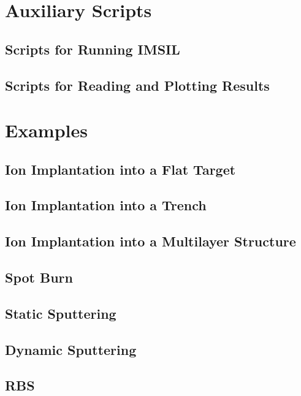\documentclass[twoside,12pt]{book}
\newcommand{\ifprivate}{\iffalse}    %
\begin{document}
\chapter{Auxiliary Scripts}
\label{k:scripts}

%
\section{Scripts for Running IMSIL}
\label{s:scripts_run}

%
\section{Scripts for Reading and Plotting Results}
\label{s:scripts_read}

%
%
\chapter{Examples}
\label{k:ex}
%
\section{Ion Implantation into a Flat Target}

%
\section{Ion Implantation into a Trench}


\section{Ion Implantation into a Multilayer Structure}


\section{Spot Burn}


\section{Static Sputtering}


\section{Dynamic Sputtering}


\section{RBS}


\ifprivate
\section{Example 2}
\footnote{This example is currently not functional.}

\fi
%
%
%

%

%
\end{document}
